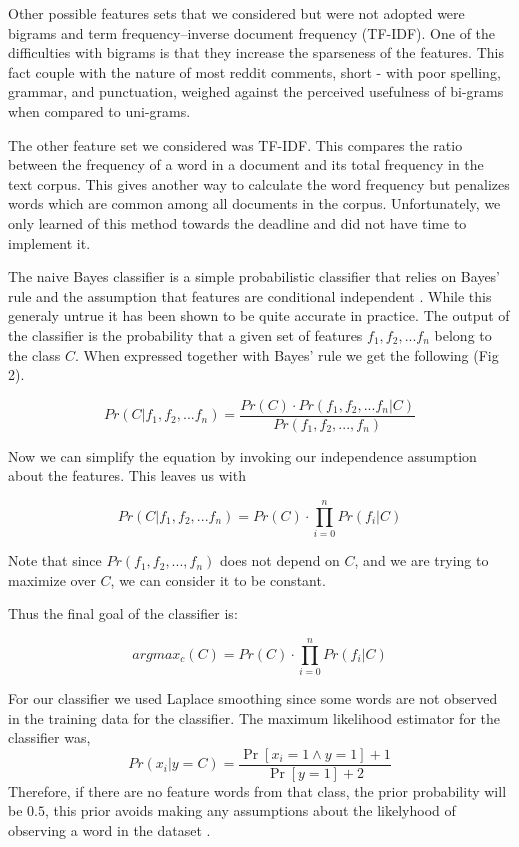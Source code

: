 \documentclass[10pt,twocolumn]{article}
\begin{document}
Other possible features sets that we considered but were not adopted were bigrams and term frequency–inverse document frequency (TF-IDF)\cite{salton1983introduction}. One of the difficulties with bigrams is that they increase the sparseness of the features. This fact couple with the nature of most reddit comments, short - with poor spelling, grammar, and punctuation, weighed against the perceived usefulness of bi-grams when compared to uni-grams.

The other feature set we considered  was TF-IDF. This compares the ratio between the frequency of a word in a document and its total frequency in the text corpus. This gives another way to calculate the word frequency but penalizes words which are common among all documents in the corpus. Unfortunately, we only learned of this method towards the deadline and did not have time to implement it.

The naive Bayes classifier is a simple probabilistic classifier that relies on Bayes' rule and the assumption that features are conditional independent \cite{bishop2006pattern}. While this generaly untrue it has been shown to be quite accurate in practice. The output of the classifier is the probability that a given set of features $f_1,f_2,...f_n$ belong to the class $C$. When expressed together with Bayes' rule we get the following (Fig 2).

\[ Pr(C|f_1,f_2,...f_n) = \frac{Pr(C) \cdot Pr(f_1,f_2,...f_n|C)}{Pr(f_1,f_2,...,f_n)} \]

Now we can simplify the equation by invoking our independence assumption about the features. This leaves us with

\[ Pr(C|f_1,f_2,...f_n) =  Pr(C) \cdot \prod_{i=0}^{n} Pr(f_i|C) \]

Note that since $Pr(f_1,f_2,...,f_n)$ does not depend on $C$, and we are trying to maximize over $C$, we can consider it to be constant.

Thus the final goal of the classifier is:

\[ argmax_c (C) = Pr(C) \cdot \prod_{i=0}^{n} Pr(f_i|C) \]

For our classifier we used Laplace smoothing since some words are not observed in the training data for the classifier. The maximum likelihood estimator for the classifier was,
\[
Pr(x_i|y=C) = \frac {\Pr[x_i=1 \land y=1]+1}{\Pr[y=1]+2}
\]
Therefore, if there are no feature words from that class, the prior probability will be $0.5$, this prior avoids making any assumptions about the likelyhood of observing a word in the dataset \cite{bishop2006pattern}.
\end{document}
